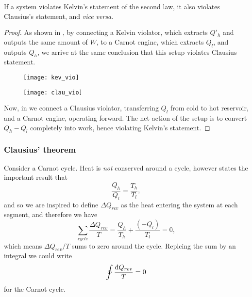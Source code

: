 \begin{prop}
If a system violates Kelvin's statement of the second law, it also violates Clausius's statement, and \textit{vice versa}. 
\end{prop}
\begin{proof}
As shown in , by connecting a Kelvin violator, which extracts $Q'_h$ and outputs the same amount of $W$, to a Carnot engine, which extracts $Q_l$, and outputs $Q_h$, we arrive at the same conclusion that this setup violates Clausius statement. 

\begin{figure}[!htbp]
	\texttt{[image: kev\_vio]}
	\centering
	\caption{}
	\label{kelvin_vio}
\end{figure}
\begin{figure}[!htbp]
	\texttt{[image: clau\_vio]}
	\centering
	\caption{}
	\label{clau_vio}
\end{figure}

Now, in  we connect a Clausius violator, transferring $Q_l$ from cold to hot reservoir, 
and a Carnot engine, operating forward. 
The net action of the setup is to convert $Q_h-Q_l$ completely into work, 
hence violating Kelvin's statement.
\end{proof}

\subsubsection{Clausius' theorem}
Consider a Carnot cycle. Heat is \textit{not} conserved around a cycle, however  states the important result that 
\begin{equation}
\frac{Q_h}{Q_l}=\frac{T_h}{T_l}, 
\end{equation}
and so we are inspired to define $\Delta Q_{rev}$ as the heat entering the system at each segment, and therefore we have 
\begin{equation}
	\sum_{cycle}\frac{\Delta Q_{rev}}{T}=\frac{Q_h}{T_h}+\frac{\left(-Q_l\right)}{T_l}=0, 
\end{equation}
which means $\Delta Q_{rev}/T$ sums to zero around the cycle. Replcing the sum by an integral we could write 
\begin{equation}
	\oint \frac{\indiff Q_{rev}}{T}=0
\end{equation}
for the Carnot cycle. 

